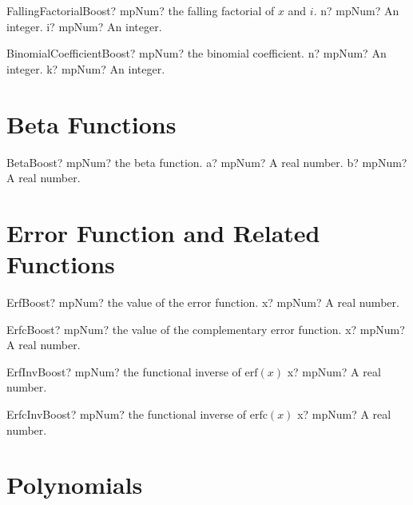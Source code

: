 \documentclass[12pt,a4paper,openany]{book}
\begin{document}
\begin{mpFunctionsExtract}
\mpFunctionTwo
{FallingFactorialBoost? mpNum? the falling factorial of $x$ and $i$.}
{n? mpNum? An integer.}
{i? mpNum? An integer.}
\end{mpFunctionsExtract}

\begin{mpFunctionsExtract}
\mpFunctionTwo
{BinomialCoefficientBoost? mpNum? the binomial coefficient.}
{n? mpNum? An integer.}
{k? mpNum? An integer.}
\end{mpFunctionsExtract}

\section{Beta Functions}

\begin{mpFunctionsExtract}
\mpFunctionTwo
{BetaBoost? mpNum? the beta function.}
{a? mpNum? A real number.}
{b? mpNum? A real number.}
\end{mpFunctionsExtract}

\section{Error Function and Related Functions}

\begin{mpFunctionsExtract}
\mpFunctionOne
{ErfBoost? mpNum? the value of the error function.}
{x? mpNum? A real number.}
\end{mpFunctionsExtract}

\begin{mpFunctionsExtract}
\mpFunctionOne
{ErfcBoost? mpNum? the value of the complementary error function.}
{x? mpNum? A real number.}
\end{mpFunctionsExtract}

\begin{mpFunctionsExtract}
\mpFunctionOne
{ErfInvBoost? mpNum? the functional inverse of $\text{erf}(x)$}
{x? mpNum? A real number.}
\end{mpFunctionsExtract}

\begin{mpFunctionsExtract}
\mpFunctionOne
{ErfcInvBoost? mpNum? the functional inverse of $\text{erfc}(x)$}
{x? mpNum? A real number.}
\end{mpFunctionsExtract}

\section{Polynomials}
\end{document}
